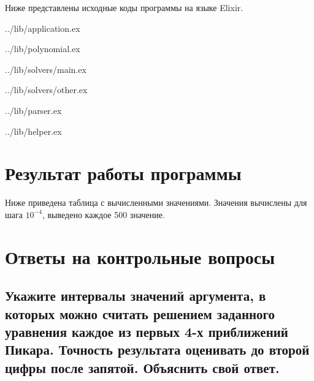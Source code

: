 Ниже представлены исходные коды программы на языке Elixir.

\begin{lstinputlisting}[
        caption={Основной модуль приложения},
        style={mystyle},
    ]{../lib/application.ex}
\end{lstinputlisting}

\begin{lstinputlisting}[
        caption={Функции для работы с многочленами},
        style={mystyle},
    ]{../lib/polynomial.ex}
\end{lstinputlisting}

\begin{lstinputlisting}[
        caption={Модуль реализации метода Пикара},
        style={mystyle},
    ]{../lib/solvers/main.ex}
\end{lstinputlisting}

\begin{lstinputlisting}[
        caption={Модуль реализации методов Эйлера и Рунге-Кутта},
        style={mystyle},
    ]{../lib/solvers/other.ex}
\end{lstinputlisting}

\begin{lstinputlisting}[
        caption={Вспомогательный модуль чтения ввода},
        style={mystyle},
    ]{../lib/parser.ex}
\end{lstinputlisting}

\begin{lstinputlisting}[
        caption={Модуль со вспомогательными функциями},
        style={mystyle},
    ]{../lib/helper.ex}
\end{lstinputlisting}

\chapter{Результат работы программы}

Ниже приведена таблица с вычисленными значениями. Значения вычислены для шага $10^{-4}$, выведено каждое 500 значение.


\chapter{Ответы на контрольные вопросы}

\section{Укажите интервалы значений аргумента, в которых можно считать решением заданного уравнения каждое из первых 4-х приближений Пикара. Точность результата оценивать до второй цифры после запятой. Объяснить свой ответ.}


